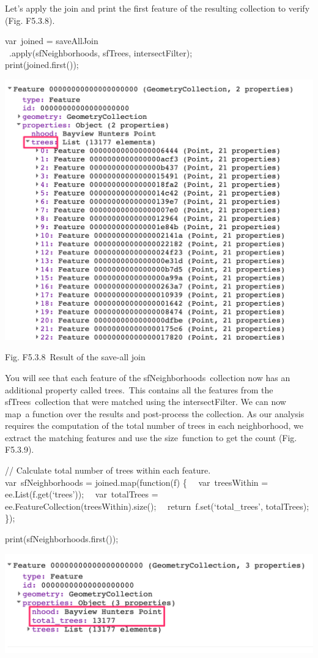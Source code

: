 \documentclass[
  letterpaper,
  DIV=11,
  numbers=noendperiod]{scrreprt}
\begin{document}
Let's apply the join and print the first feature of the resulting
collection to verify (Fig. F5.3.8).

var~joined = saveAllJoin\\
\hspace*{0.333em} ~.apply(sfNeighborhoods, sfTrees, intersectFilter);\\
print(joined.first());

\includegraphics{./F5/image1.png}

Fig. F5.3.8~Result of the save-all join

You will see that each feature of the sfNeighborhoods~collection now has
an additional property called trees.~This contains all the features from
the sfTrees~collection that were matched using the intersectFilter. We
can now map~a function over the results and post-process the collection.
As our analysis requires the computation of the total number of trees in
each neighborhood, we extract the matching features and use the
size~function to get the count (Fig. F5.3.9).

// Calculate total number of trees within each feature.\\
var~sfNeighborhoods = joined.map(function(f) \{~ ~var~treesWithin =
ee.List(f.get(`trees'));~ ~var~totalTrees =
ee.FeatureCollection(treesWithin).size();~ ~return~f.set(`total\_trees',
totalTrees);\\
\});

print(sfNeighborhoods.first());

\includegraphics{./F5/image18.png}
\end{document}

